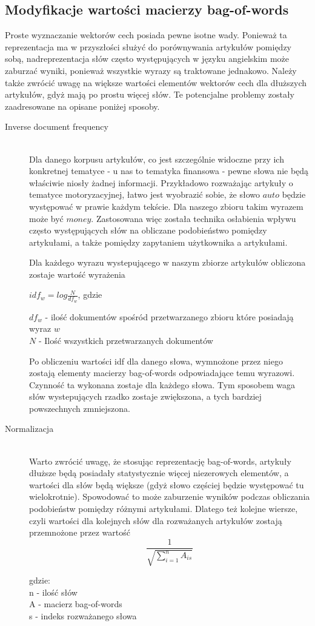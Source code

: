 \subsection{Modyfikacje wartości macierzy bag-of-words}
Proste wyznaczanie wektorów cech posiada pewne isotne wady. Ponieważ ta reprezentacja ma w przyszłości służyć do porównywania artykułów pomiędzy sobą, nadreprezentacja słów często występujących w języku angielskim może zaburzać wyniki, ponieważ wszystkie wyrazy są traktowane jednakowo. Należy także zwrócić uwagę na większe wartości elementów wektorów cech dla dłuższych artykułów, gdyż mają po prostu więcej słów. Te potencjalne problemy zostały zaadresowane na opisane poniżej sposoby.

\begin{description}
  \item[Inverse document frequency] \hfill \\
Dla danego korpusu artykułów, co jest szczególnie widoczne przy ich konkretnej tematyce - u nas to tematyka finansowa - pewne słowa nie będą właściwie niosły żadnej informacji. Przykładowo rozważając artykuły o tematyce motoryzacyjnej, łatwo jest wyobrazić sobie, że słowo $auto$  będzie występować w prawie każdym tekście. Dla naszego zbioru takim wyrazem może być $money$. Zastosowana więc została technika osłabienia wpływu często występujących słów na obliczane podobieństwo pomiędzy artykułami, a także pomiędzy zapytaniem użytkownika a artykułami.

Dla każdego wyrazu wystepującego w naszym zbiorze artykułów obliczona zostaje wartość wyrażenia

\begin{center}
$idf_w = log\frac{N}{df_w}$, gdzie\\
\end{center}
$df_w$ - ilość dokumentów spośród przetwarzanego zbioru które posiadają wyraz $w$\\
$N$ - Ilość wszystkich przetwarzanych dokumentów 

Po obliczeniu wartości idf dla danego słowa, wymnożone przez niego zostają elementy macierzy bag-of-words odpowiadające temu wyrazowi. Czynność ta wykonana zostaje dla każdego słowa. Tym sposobem waga słów wystepujących rzadko zostaje zwiększona, a tych bardziej powszechnych zmniejszona.

  \item[Normalizacja] \hfill \\
Warto zwrócić uwagę, że stosując reprezentację bag-of-words, artykuły dłuższe będą posiadały statystycznie więcej niezerowych elementów, a wartości dla słów będą większe (gdyż słowo częściej będzie występować tu wielokrotnie). Spowodować to może zaburzenie wyników podczas obliczania podobieństw pomiędzy różnymi artykułami. Dlatego też kolejne wiersze, czyli wartości dla kolejnych słów dla rozważanych artykułów zostają przemnożone przez wartość
$$\frac{1}{\sqrt{\sum\limits_{i=1}^{n} A_{is}}}$$

gdzie:\\
n - ilość słów\\
A - macierz bag-of-words\\
s - indeks rozważanego słowa\\
 
\end{description}
